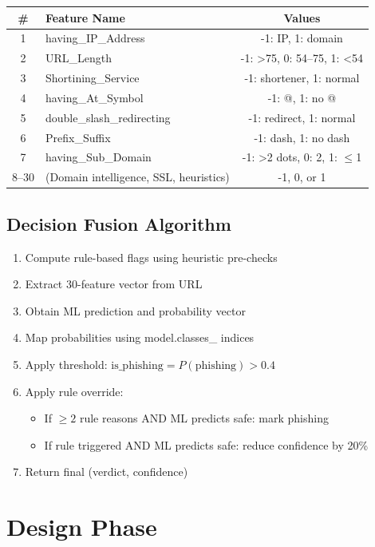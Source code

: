 \documentclass[12pt,a4paper]{report}
\begin{document}
\begin{longtable}{c l c}
\toprule
\textbf{\#} & \textbf{Feature Name} & \textbf{Values} \\
\midrule
1 & having\_IP\_Address & -1: IP, 1: domain \\
2 & URL\_Length & -1: >75, 0: 54--75, 1: <54 \\
3 & Shortining\_Service & -1: shortener, 1: normal \\
4 & having\_At\_Symbol & -1: @, 1: no @ \\
5 & double\_slash\_redirecting & -1: redirect, 1: normal \\
6 & Prefix\_Suffix & -1: dash, 1: no dash \\
7 & having\_Sub\_Domain & -1: >2 dots, 0: 2, 1: $\leq$1 \\
8--30 & (Domain intelligence, SSL, heuristics) & -1, 0, or 1 \\
\bottomrule
\end{longtable}

\subsection{Decision Fusion Algorithm}
\begin{enumerate}[leftmargin=*]
    \item Compute rule-based flags using heuristic pre-checks
    \item Extract 30-feature vector from URL
    \item Obtain ML prediction and probability vector
    \item Map probabilities using model.classes\_ indices
    \item Apply threshold: $\text{is\_phishing} = P(\text{phishing}) > 0.4$
    \item Apply rule override:
        \begin{itemize}[leftmargin=*]
            \item If $\geq 2$ rule reasons AND ML predicts safe: mark phishing
            \item If rule triggered AND ML predicts safe: reduce confidence by 20\%
        \end{itemize}
    \item Return final (verdict, confidence)
\end{enumerate}

\section{Design Phase}
\end{document}
